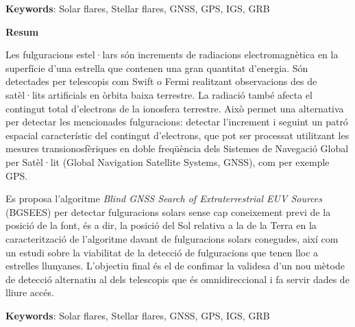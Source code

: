 \textbf{Keywords}: Solar flares, Stellar flares, GNSS, GPS, IGS, GRB

\clearpage
\thispagestyle{empty}
\begin{center}
	\Large
	\textbf{Resum}
\end{center}
Les fulguracions estel·lars són increments de radiacions electromagnètica en la superfície d'una estrella que contenen una gran quantitat d'energia. Són detectades per telescopis com Swift o Fermi realitzant observacions des de satèl·lits artificials en òrbita baixa terrestre. La radiació també afecta el contingut total d'electrons de la ionosfera terrestre. Això permet una alternativa per detectar les mencionades fulguracions: detectar l'increment i seguint un patró espacial característic del contingut d'electrons, que pot ser processat utilitzant les mesures transionosfèriques en doble freqüència dels Sistemes de Navegació Global per Satèl·lit (Global Navigation Satellite Systems, GNSS), com per exemple GPS.

Es proposa l'algoritme \textit{Blind GNSS Search of Extraterrestrial EUV Sources} (BGSEES) per detectar fulguracions solars sense cap coneixement previ de la posició de la font, és a dir, la posició del Sol relativa a la de la Terra en la caracterització de l'algoritme davant de fulguracions solars conegudes, així com un estudi sobre la viabilitat de la detecció de fulguracions que tenen lloc a estrelles llunyanes. L'objectiu final és el de confimar la validesa d'un nou mètode de detecció alternatiu al dels telescopis que és omnidireccional i fa servir dades de lliure accés.

\textbf{Keywords}: Solar flares, Stellar flares, GNSS, GPS, IGS, GRB